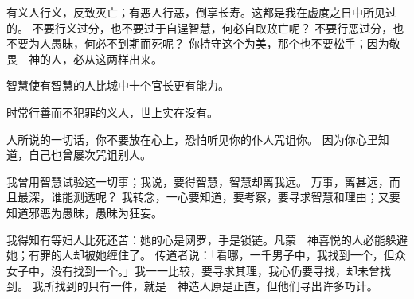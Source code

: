 {\par }{\PP {}有义人行义，反致灭亡；有恶人行恶，倒享长寿。这都是我在虚度之日中所见过的。
不要行义过分，也不要过于自逞智慧，何必自取败亡呢？
不要行恶过分，也不要为人愚昧，何必不到期而死呢？
你持守这个为美，那个也不要松手；因为敬畏　神的人，必从这两样出来。
\par }{\PP {}智慧使有智慧的人比城中十个官长更有能力。
\par }{\PP {}时常行善而不犯罪的义人，世上实在没有。
\par }{\PP {}人所说的一切话，你不要放在心上，恐怕听见你的仆人咒诅你。
因为你心里知道，自己也曾屡次咒诅别人。
\par }{\PP {}我曾用智慧试验这一切事；我说，要得智慧，智慧却离我远。
万事{}，离{}甚远，而且最深，谁能测透呢？
我转念，一心要知道，要考察，要寻求智慧和{}理由；又要知道邪恶为愚昧，愚昧为狂妄。
\par }{\PP {}我得知有等妇人比死还苦：她的心是网罗，手是锁链。凡蒙　神喜悦的人必能躲避她；有罪的人却被她缠住了。
传道者说：「看哪，一千男子中，我找到一个{}，但众女子中，没有找到一个。」我{}一一比较，要寻求其理，我心仍要寻找，却未曾找到。
我所找到的只有一件，就是　神造人原是正直，但他们寻出许多巧计。

}
